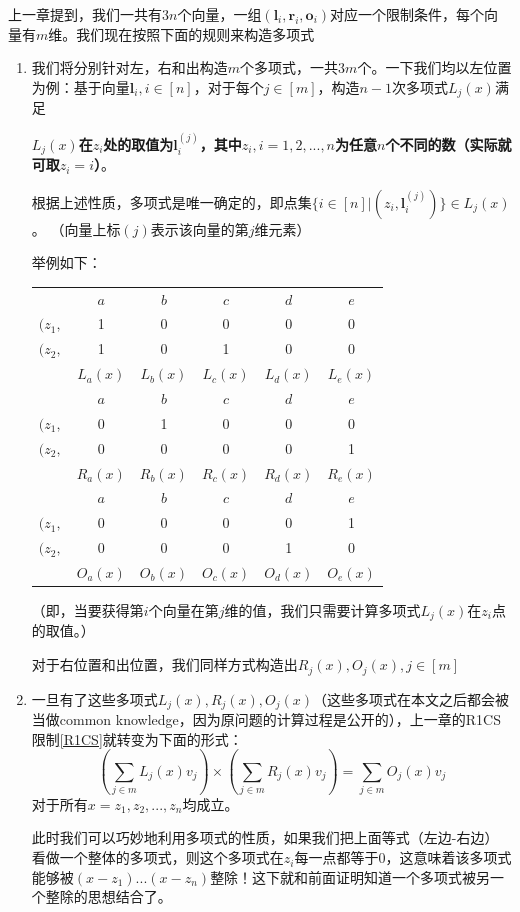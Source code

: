 \documentclass[12pt]{article}
\begin{document}
上一章提到，我们一共有$3n$个向量，一组$(\bm{l}_i,\bm{r}_i,\bm{o}_i)$对应一个限制条件，每个向量有$m$维。我们现在按照下面的规则来构造多项式
\begin{enumerate}
	\item 我们将分别针对左，右和出构造$m$个多项式，一共$3m$个。一下我们均以左位置为例：基于向量$\bm{l}_i,i \in [n]$，对于每个$j \in [m]$，构造$n-1$次多项式$L_j(x)$满足

	\textbf{$L_j(x)$在$z_i$处的取值为$\bm{l}_i^{(j)}$，其中$z_i,i=1,2,...,n$为任意$n$个不同的数（实际就可取$z_i=i$）}。

	根据上述性质，多项式是唯一确定的，即点集$\{i \in [n]|(z_i,\bm{l}_i^{(j)})\} \in L_j(x)$。   （向量上标$(j)$表示该向量的第$j$维元素）

	举例如下：
  \begin{tabular}{c|c|c|c|c|c|}
  	\label{tab:1}
  	             & $a$ & $b$ & $c$ & $d$ & $e$ \\
  	 $(z_1,$   &  1    & 0& 0& 0& 0\\
  	 $(z_2,$  &  1  &   0 & 1 & 0 & 0 \\
  	          &   $L_a(x)$&$L_b(x)$&$L_c(x)$&$L_d(x)$&$L_e(x)$\\
  	  & $a$ & $b$ & $c$ & $d$ & $e$ \\
  	  $(z_1,$   &  0    & 1& 0& 0& 0\\
  	  $(z_2,$  &  0  &   0 & 0 & 0 & 1 \\
  	  &   $R_a(x)$&$R_b(x)$&$R_c(x)$&$R_d(x)$&$R_e(x)$\\
  	    	& $a$ & $b$ & $c$ & $d$ & $e$ \\
  	  $(z_1,$   &  0    & 0& 0& 0& 1\\
  	  $(z_2,$  &  0  &   0 & 0 & 1 & 0 \\
  	  &   $O_a(x)$&$O_b(x)$&$O_c(x)$&$O_d(x)$&$O_e(x)$
  \end{tabular}

	（即，当要获得第$i$个向量在第$j$维的值，我们只需要计算多项式$L_j(x)$在$z_i$点的取值。）

	对于右位置和出位置，我们同样方式构造出$R_j(x),O_j(x), j \in [m]$

	\item 一旦有了这些多项式$L_j(x),R_j(x),O_j(x)$（这些多项式在本文之后都会被当做common knowledge，因为原问题的计算过程是公开的），上一章的R1CS限制\ref{R1CS}就转变为下面的形式：
	$$ (\sum_{j \in m} L_j(x)v_j)\times (\sum_{j \in m} R_j(x)v_j) = \sum_{j \in m} O_j(x)v_j$$
	对于所有$x=z_1,z_2,...,z_n$均成立。

	此时我们可以巧妙地利用多项式的性质，如果我们把上面等式（左边-右边）看做一个整体的多项式，则这个多项式在$z_i$每一点都等于0，这意味着该多项式能够被$(x-z_1)...(x-z_n)$整除！这下就和前面证明知道一个多项式被另一个整除的思想结合了。


\end{enumerate}
\end{document}

